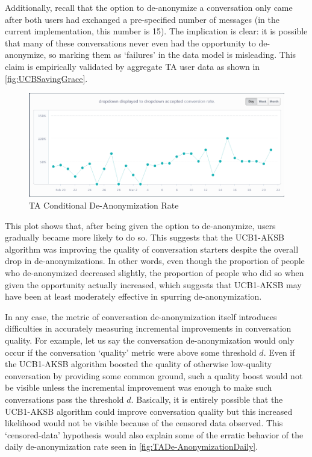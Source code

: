 Additionally, recall that the option to de-anonymize a conversation only came after both users had exchanged a pre-specified number of messages (in the current implementation, this number is 15). The implication is clear: it is possible that many of these conversations never even had the opportunity to de-anonymize, so marking them as `failures' in the data model is misleading. This claim is empirically validated by aggregate TA user data as shown in \autoref{fig:UCBSavingGrace}. 

\begin{figure}[H]
\centering
\includegraphics[trim= 1mm 1mm 0mm 1mm, clip, scale=0.45]{./Figures/UCBSavingGrace}
\caption{TA Conditional De-Anonymization Rate}
\label{fig:UCBSavingGrace}
\end{figure}

This plot shows that, after being given the option to de-anonymize, users gradually became more likely to do so. This suggests that the UCB1-AKSB algorithm was improving the quality of conversation starters despite the overall drop in de-anonymizations. In other words, even though the proportion of people who de-anonymized decreased slightly, the proportion of people who did so when given the opportunity actually increased, which suggests that UCB1-AKSB may have been at least moderately effective in spurring de-anonymization.

In any case, the metric of conversation de-anonymization itself introduces difficulties in accurately measuring incremental improvements in conversation quality. For example, let us say the conversation de-anonymization would only occur if the conversation `quality' metric were above some threshold $d$. Even if the UCB1-AKSB algorithm boosted the quality of otherwise low-quality conversation by providing some common ground, such a quality boost would not be visible unless the incremental improvement was enough to make such conversations pass the threshold $d$. Basically, it is entirely possible that the UCB1-AKSB algorithm could improve conversation quality but this increased likelihood would not be visible because of the censored data observed. This `censored-data' hypothesis would also explain some of the erratic behavior of the daily de-anonymization rate seen in \autoref{fig:TADe-AnonymizationDaily}.


